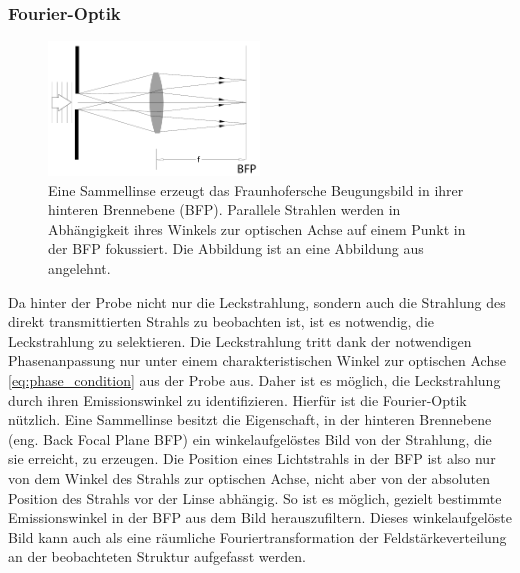 \documentclass[titlepage,  ngerman]{article}
\begin{document}
	\subsubsection{Fourier-Optik}
	\label{sec:fourier}
	\begin{figure}[htbp] 
		\centering
		\includegraphics[width=0.5\textwidth]{figures/FourierLinse.pdf}
		\caption[Fourieroptik]{Eine Sammellinse erzeugt das Fraunhofersche Beugungsbild in ihrer hinteren Brennebene (BFP). Parallele Strahlen werden in Abhängigkeit ihres Winkels zur optischen Achse auf einem Punkt in der BFP fokussiert. Die Abbildung ist an eine Abbildung aus \cite{Hecht.2018} angelehnt.}
		\label{fig:FourierLinse}
	\end{figure}
	Da hinter der Probe nicht nur die Leckstrahlung, sondern auch die Strahlung des direkt transmittierten Strahls zu beobachten ist, ist es notwendig, die Leckstrahlung zu selektieren. Die Leckstrahlung tritt dank der notwendigen Phasenanpassung nur unter einem charakteristischen Winkel zur optischen Achse \eqref{eq:phase_condition} aus der Probe aus. Daher ist es möglich, die Leckstrahlung durch ihren Emissionswinkel zu identifizieren. Hierfür ist die Fourier-Optik nützlich. Eine Sammellinse besitzt die Eigenschaft, in  der hinteren Brennebene (eng. Back Focal Plane BFP) ein winkelaufgelöstes Bild von der Strahlung, die sie erreicht, zu erzeugen\cite{Hecht.1996}. Die Position eines Lichtstrahls in der BFP ist also nur von dem Winkel des Strahls zur optischen Achse, nicht aber von der absoluten Position des Strahls vor der Linse abhängig. So ist es möglich, gezielt bestimmte Emissionswinkel in der BFP aus dem Bild herauszufiltern. Dieses winkelaufgelöste Bild kann auch als eine räumliche Fouriertransformation der Feldstärkeverteilung an der beobachteten Struktur aufgefasst werden. 
	
\end{document}
